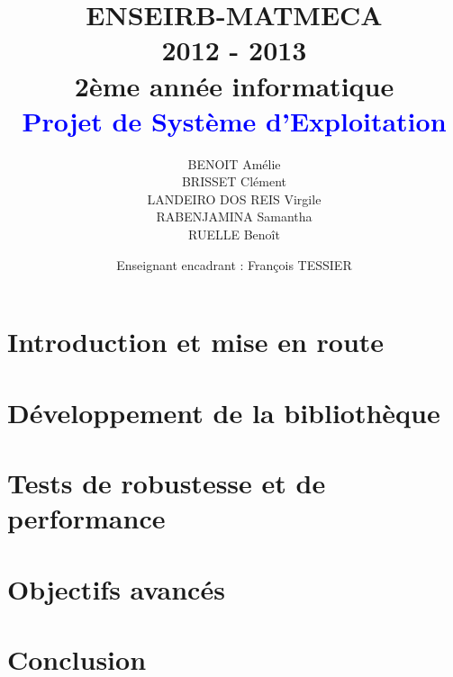 \documentclass[a4paper,12pt]{article}
\title{
	\normalsize{ENSEIRB-MATMECA \\ 
	2012 - 2013 \\
	2ème année informatique} \\
	\vspace{15mm}
	\Huge{\textcolor{blue}{Projet de Système d'Exploitation }}
}
\author{ BENOIT Amélie \\ BRISSET Clément \\ LANDEIRO DOS REIS Virgile \\ RABENJAMINA Samantha \\ RUELLE Benoît}
\date{
	\normalsize{Enseignant encadrant : François TESSIER}
}
\begin{document}
\maketitle
\clearpage
\tableofcontents
\clearpage

\section{Introduction et mise en route}


\section{Développement de la bibliothèque}


\section{Tests de robustesse et de performance}


\section{Objectifs avancés}


\section{Conclusion}

\end{document}
